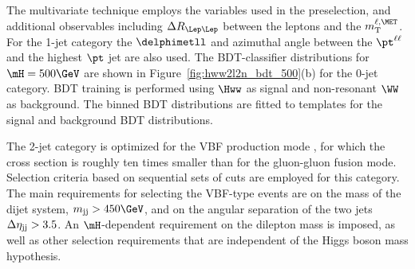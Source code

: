 The multivariate technique employs the variables used in the preselection, and additional observables including
$\Delta R_{\Lep\Lep}$ between the leptons and the $m_\mathrm{T}^{\ell,\MET}$. For the 1-jet category the $\delphimetll$ and
azimuthal angle between the $\pt^{\ell\ell}$ and the highest $\pt$ jet are also used. The BDT-classifier distributions for $\mH=500\GeV$ are shown in Figure~\ref{fig:hww2l2n_bdt_500}(b) for the 0-jet category. BDT training is performed using $\Hww$ as signal and non-resonant $\WW$ as background. The binned BDT distributions are fitted to templates for the signal and background BDT distributions.


The 2-jet category is optimized for the VBF production mode \cite{Ciccolini:2007jr,Ciccolini:2007ec,Arnold:2008rz,Cahn:1987}, for which the cross section is roughly ten times smaller than for the gluon-gluon fusion mode. Selection criteria based on sequential sets of cuts are employed for this category.
The main requirements for selecting the VBF-type events are on the mass of the dijet system, $m_{\rm{jj}} > 450\GeV$, and on the angular separation of the two jets $\Delta \eta_{\rm{jj}} > 3.5$. An $\mH$-dependent requirement on the dilepton mass
is imposed, as well as other selection requirements that are independent of the Higgs boson mass hypothesis.

